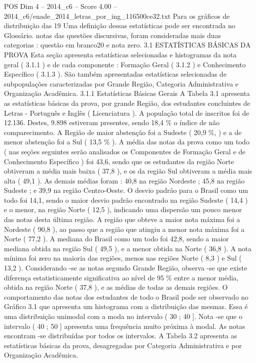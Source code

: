 \begin{textsample}{POS Dim 4 – 2014\_c6 – Score 4.00 – 2014\_c6/enade\_2014\_letras\_por\_ing\_116500ce32.txt}
Para os gráficos de distribuição das 19 Uma definição dessas estatísticas pode ser encontrada no Glossário. notas das questões discursivas, foram consideradas mais duas categorias : questão em branco20 e nota zero. 3.1 ESTATÍSTICAS BÁSICAS DA PROVA Esta seção apresenta estatísticas selecionadas e histogramas da nota geral ( 3.1.1 ) e de cada componente : Formação Geral ( 3.1.2 ) e Conhecimento Específico ( 3.1.3 ).
São também apresentadas estatísticas selecionadas de subpopulações caracterizadas por Grande Região, Categoria Administrativa e Organização Acadêmica. 3.1.1 Estatísticas Básicas Gerais A Tabela 3.1 apresenta as estatísticas básicas da prova, por grande Região, dos estudantes concluintes de Letras - Português e Inglês ( Licenciatura ).
A população total de inscritos foi de 12.136.
Destes, 9.898 estiveram presentes, sendo 18,4 \% o índice de não comparecimento.
A Região de maior abstenção foi a Sudeste ( 20,9 \%, ) e a de menor abstenção foi a Sul ( 13,5 \% ).
A média das notas da prova como um todo ( nas seções seguintes serão analisados os Componentes de Formação Geral e de Conhecimento Específico ) foi 43,6, sendo que os estudantes da região Norte obtiveram a média mais baixa ( 37,8 ), e os da região Sul obtiveram a média mais alta ( 49,1 ).
As demais médias foram : 40,8 na região Nordeste ; 45,8 na região Sudeste ; e 39,9 na região Centro-Oeste.
O desvio padrão para o Brasil como um todo foi 14,1, sendo o maior desvio padrão encontrado na região Sudeste ( 14,4 ) e o menor, na região Norte ( 12,5 ), indicando uma dispersão um pouco menor das notas desta última região.
A região que obteve a maior nota máxima foi a Nordeste ( 90,8 ), ao passo que a região que atingiu a menor nota máxima foi a Norte ( 77,2 ).
A mediana do Brasil como um todo foi 42,8, sendo a maior mediana obtida na região Sul ( 49,5 ), e a menor obtida na Norte ( 36,8 ).
A nota mínima foi zero na maioria das regiões, menos nas regiões Norte ( 8,3 ) e Sul ( 13,2 ).
Considerando -se as notas segundo Grande Região, observa -se que existe diferença estatisticamente significativa ao nível de 95 \% entre a menor média, obtida na região Norte ( 37,8 ), e as médias de todas as demais regiões.
O comportamento das notas dos estudantes de todo o Brasil pode ser observado no Gráfico 3.1 que apresenta um histograma com a distribuição das mesmas.
Essa é uma distribuição unimodal com a moda no intervalo ( 30 ; 40 ].
Nota -se que o intervalo ( 40 ; 50 ] apresenta uma frequência muito próxima à modal.
As notas encontram -se distribuídas por todos os intervalos.
A Tabela 3.2 apresenta as estatísticas básicas da prova, desagregadas por Categoria Administrativa e por Organização Acadêmica.

\end{textsample}
